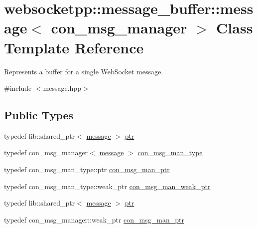 \hypertarget{classwebsocketpp_1_1message__buffer_1_1message}{}\section{websocketpp\+:\+:message\+\_\+buffer\+:\+:message$<$ con\+\_\+msg\+\_\+manager $>$ Class Template Reference}
\label{classwebsocketpp_1_1message__buffer_1_1message}


Represents a buffer for a single Web\+Socket message.  




{\ttfamily \#include $<$message.\+hpp$>$}

\subsection*{Public Types}
\begin{DoxyCompactItemize}
\item 
typedef lib\+::shared\+\_\+ptr$<$ \hyperlink{classwebsocketpp_1_1message__buffer_1_1message}{message} $>$ \hyperlink{classwebsocketpp_1_1message__buffer_1_1message_adb52b5feb820ec7bc6140cc8be9edd57}{ptr}
\item 
typedef con\+\_\+msg\+\_\+manager$<$ \hyperlink{classwebsocketpp_1_1message__buffer_1_1message}{message} $>$ \hyperlink{classwebsocketpp_1_1message__buffer_1_1message_a30657669d087f13475246f946d6b6361}{con\+\_\+msg\+\_\+man\+\_\+type}
\item 
typedef con\+\_\+msg\+\_\+man\+\_\+type\+::ptr \hyperlink{classwebsocketpp_1_1message__buffer_1_1message_abb7a33ceab94975c7503102537c33b48}{con\+\_\+msg\+\_\+man\+\_\+ptr}
\item 
typedef con\+\_\+msg\+\_\+man\+\_\+type\+::weak\+\_\+ptr \hyperlink{classwebsocketpp_1_1message__buffer_1_1message_a54e04850b167306ef4e04ac2612e5c18}{con\+\_\+msg\+\_\+man\+\_\+weak\+\_\+ptr}
\item 
typedef lib\+::shared\+\_\+ptr$<$ \hyperlink{classwebsocketpp_1_1message__buffer_1_1message}{message} $>$ \hyperlink{classwebsocketpp_1_1message__buffer_1_1message_adb52b5feb820ec7bc6140cc8be9edd57}{ptr}
\item 
typedef con\+\_\+msg\+\_\+manager\+::weak\+\_\+ptr \hyperlink{classwebsocketpp_1_1message__buffer_1_1message_a7fff9a702f65dc3f1b75058664833db5}{con\+\_\+msg\+\_\+man\+\_\+ptr}
\end{DoxyCompactItemize}
